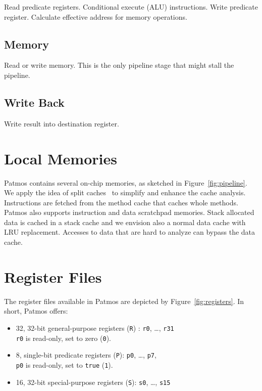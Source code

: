 \documentclass[a4paper,fontsize=10pt,twoside,DIV15,BCOR12mm,headinclude=true,footinclude=false,pagesize,bibtotoc]{scrbook}
\newcommand{\comment}[3]{

\textsf{\textbf{#1}} {\color{#3}#2}}
\newcommand{\stefan}[1]{\comment{Stefan}{#1}{RoyalPurple}}
\renewcommand{\stefan}[1]{}
\begin{document}
Read predicate registers. Conditional execute (ALU) instructions.
Write predicate register. Calculate effective address for memory operations.

\subsection{Memory}

Read or write memory. This is the only pipeline stage that might
stall the pipeline.

\subsection{Write Back}

Write result into destination register.

\stefan{Note that in the \texttt{pasim} simulator the Memory and Write Back stages are merged into a single MW stage at the time of writing,
and the stages are simulated from back to front.
While this has no effect on the timing and hazards of the instructions, there is only a single bypass from MW to EX (per pipeline). Apart
from that, all implementations of all instructions in the simulator should adhere to the above description of the stages.}

\section{Local Memories}

Patmos contains several on-chip memories, as sketched in Figure~\ref{fig:pipeline}.
We apply the idea of split caches~\cite{jop:dcache:rts} to simplify and enhance
the cache analysis. Instructions are fetched from the method cache that caches
whole methods. Patmos also supports instruction and data scratchpad memories.
Stack allocated data is cached in a stack cache and we envision also a normal
data cache with LRU replacement. Accesses to data that are hard to analyze can
bypass the data cache.




\section{Register Files}

The register files available in Patmos are depicted by
Figure~\ref{fig:registers}. In short, Patmos offers:
\begin{itemize}
  \item 32, 32-bit general-purpose registers (\texttt{R}) : \texttt{r0}, \ldots, \texttt{r31} \\
    \texttt{r0} is read-only, set to zero (\texttt{0}).
  \item 8, single-bit predicate registers (\texttt{P}): \texttt{p0}, \ldots, \texttt{p7}, \\
    \texttt{p0} is read-only, set to \texttt{true} (\texttt{1}).
  \item 16, 32-bit special-purpose registers (\texttt{S}): \texttt{s0}, \ldots, \texttt{s15}
\end{itemize}
\end{document}
